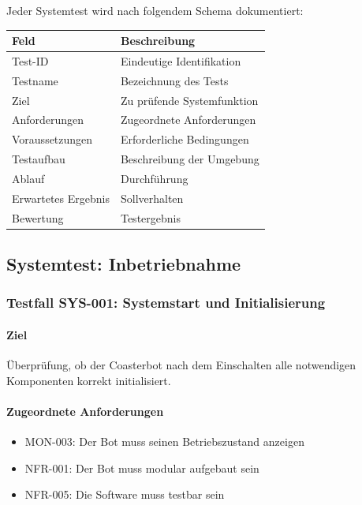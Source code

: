Jeder Systemtest wird nach folgendem Schema dokumentiert:

\begin{longtable}[]{@{}ll@{}}
\toprule\noalign{}
Feld & Beschreibung \\
\midrule\noalign{}
\endhead
\bottomrule\noalign{}
\endlastfoot
Test-ID & Eindeutige Identifikation \\
Testname & Bezeichnung des Tests \\
Ziel & Zu prüfende Systemfunktion \\
Anforderungen & Zugeordnete Anforderungen \\
Voraussetzungen & Erforderliche Bedingungen \\
Testaufbau & Beschreibung der Umgebung \\
Ablauf & Durchführung \\
Erwartetes Ergebnis & Sollverhalten \\
Bewertung & Testergebnis \\
\end{longtable}

\subsection{Systemtest: Inbetriebnahme}\label{systemtest-inbetriebnahme}

\subsubsection{Testfall SYS-001: Systemstart und
Initialisierung}\label{testfall-sys-001-systemstart-und-initialisierung}

\paragraph{Ziel}\label{ziel-24}

Überprüfung, ob der Coasterbot nach dem Einschalten alle notwendigen
Komponenten korrekt initialisiert.

\paragraph{Zugeordnete
Anforderungen}\label{zugeordnete-anforderungen-24}

\begin{itemize}
\tightlist
\item
  MON-003: Der Bot muss seinen Betriebszustand anzeigen
\item
  NFR-001: Der Bot muss modular aufgebaut sein
\item
  NFR-005: Die Software muss testbar sein
\end{itemize}

